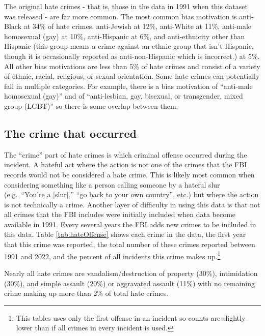 \documentclass[
]{krantz}
\begin{document}
The original hate crimes - that is, those in the data in
1991 when this dataset was released - are far more common.
The most common bias motivation is anti-Black at 34\% of
hate crimes, anti-Jewish at 12\%, anti-White at 11\%,
anti-male homosexual (gay) at 10\%, anti-Hispanic at 6\%,
and anti-ethnicity other than Hispanic (this group means a
crime against an ethnic group that isn't Hispanic, though it
is occasionally reported as anti-non-Hispanic which is
incorrect.) at 5\%. All other bias motivations are less than
5\% of hate crimes and consist of a variety of ethnic,
racial, religious, or sexual orientation. Some hate crimes
can potentially fall in multiple categories. For example,
there is a bias motivation of ``anti-male homosexual (gay)''
and of ``anti-lesbian, gay, bisexual, or transgender, mixed
group (LGBT)'' so there is some overlap between them.

\subsection{The crime that
occurred}\label{the-crime-that-occurred}

The ``crime'' part of hate crimes is which criminal offense
occurred during the incident. A hateful act where the action
is not one of the crimes that the FBI records would not be
considered a hate crime. This is likely most common when
considering something like a person calling someone by a
hateful slur (e.g.~``You're a {[}slur{]},'' ``go back to
your own country'', etc.) but where the action is not
technically a crime. Another layer of difficulty in using
this data is that not all crimes that the FBI includes were
initially included when data become available in 1991. Every
several years the FBI adds new crimes to be included in this
data. Table \ref{tab:hateOffense} shows each crime in the
data, the first year that this crime was reported, the total
number of these crimes reported between 1991 and 2022, and
the percent of all incidents this crime makes up.\footnote{This
  tables uses only the first offense in an incident so
  counts are slightly lower than if all crimes in every
  incident is used.}

Nearly all hate crimes are vandalism/destruction of property
(30\%), intimidation (30\%), and simple assault (20\%) or
aggravated assault (11\%) with no remaining crime making up
more than 2\% of total hate crimes.
\end{document}
